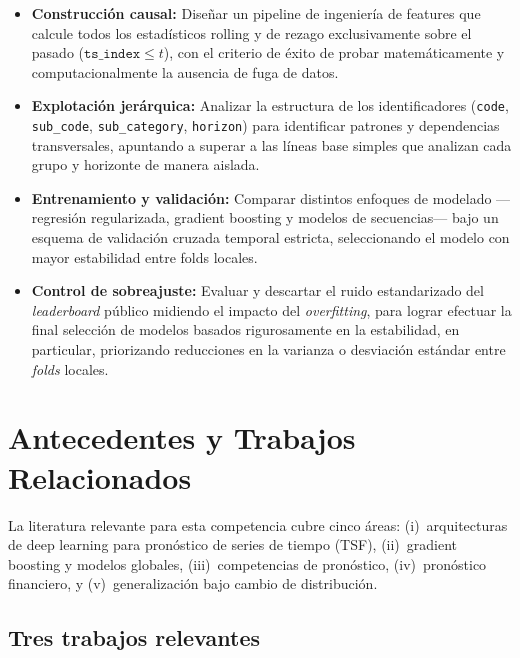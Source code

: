 \documentclass{article}
\begin{document}
\begin{itemize}
    \item \textbf{Construcción causal:} Diseñar un pipeline de ingeniería de features que calcule todos los estadísticos rolling y de rezago exclusivamente sobre el pasado ($\texttt{ts\_index} \leq t$), con el criterio de éxito de probar matemáticamente y computacionalmente la ausencia de fuga de datos.
    \item \textbf{Explotación jerárquica:} Analizar la estructura de los identificadores (\texttt{code}, \texttt{sub\_code}, \texttt{sub\_category}, \texttt{horizon}) para identificar patrones y dependencias transversales, apuntando a superar a las líneas base simples que analizan cada grupo y horizonte de manera aislada.
    \item \textbf{Entrenamiento y validación:} Comparar distintos enfoques de modelado —regresión regularizada, gradient boosting y modelos de secuencias— bajo un esquema de validación cruzada temporal estricta, seleccionando el modelo con mayor estabilidad entre folds locales.
    \item \textbf{Control de sobreajuste:} Evaluar y descartar el ruido estandarizado del \emph{leaderboard} público midiendo el impacto del \textit{overfitting}, para lograr efectuar la final selección de modelos basados rigurosamente en la estabilidad, en particular, priorizando reducciones en la varianza o desviación estándar entre \emph{folds} locales.
\end{itemize}



\section{Antecedentes y Trabajos Relacionados}

La literatura relevante para esta competencia cubre cinco áreas: (i)~arquitecturas de deep learning para pronóstico de series de tiempo (TSF), (ii)~gradient boosting y modelos globales, (iii)~competencias de pronóstico, (iv)~pronóstico financiero, y (v)~generalización bajo cambio de distribución.

\subsection{Tres trabajos relevantes}
\end{document}
